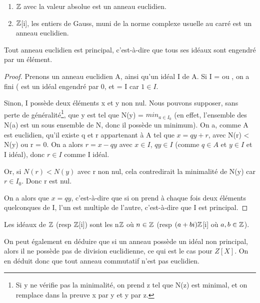\begin{exemple}
	\begin{enumerate}
		\item $\mathbb{Z}$ avec la valeur absolue est un anneau euclidien.
		\item $\mathbb{Z}$[i], les entiers de Gauss, muni de la norme complexe
			usuelle au carré est un anneau euclidien.
	\end{enumerate}
\end{exemple}

\begin{proposition}
	Tout anneau euclidien est principal, c'est-à-dire que tous ses idéaux sont
	engendré par un élément.
	\label{euclidian_implies_principal}
\end{proposition}

\begin{proof}
	Prenons un anneau euclidien A, ainsi qu'un idéal I de A. Si I = 
	ou , on a fini ( est un idéal engendré par 0, et
	 = I car $1 \in I$.

	Sinon, I possède deux éléments x et y non nul. Nous pouvons supposer, sans
	perte de généralité\footnote{Si y ne vérifie pas la minimalité, on prend z
	tel que N(z) est minimal, et on remplace dans la preuve x par y et y par
z.}, que y est tel que N(y) = $\displaystyle min_{a \in I_{0}}$ (en
effet, l'ensemble des N(a) est un sous ensemble de N, donc il possède un
minimum).
	On a, comme A est euclidien, qu'il existe q et r appartenant à A tel que $x
	= qy + r$, avec N(r) < N(y) ou r = 0.
	On a alors $r = x - qy$ avec $x \in I$, $qy \in I$ (comme $q \in A$ et $y
	\in I$ et I idéal), donc $r \in I$ comme I idéal.
	
	Or, si $N(r) < N(y)$ avec r non nul, cela contredirait la minimalité de N(y)
	car $r \in I_{0}$. Donc r est nul.

	On a alors que $x = qy$, c'est-à-dire que si on prend à chaque fois deux
	éléments quelconques de I, l'un est multiple de l'autre, c'est-à-dire que
	I est principal.
\end{proof}

\begin{corollary}
	Les idéaux de $\mathbb{Z}$ (resp $\mathbb{Z}$[i]) sont les n$\mathbb{Z}$ où $n \in
	\mathbb{Z}$ (resp $(a+bi) \mathbb{Z}$[i] où $a, b \in \mathbb{Z}$).
\end{corollary}

On peut également en déduire que si un anneau possède un idéal non principal,
alors il ne possède pas de division euclidienne, ce qui est le cas pour $Z[X]$.
On en déduit donc que tout anneau commutatif n'est pas euclidien.

